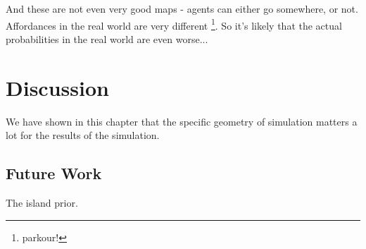 And these are not even very good maps - agents can either go somewhere, or not. Affordances in the real world are very different \footnote{parkour!}. So it's likely that the actual probabilities in the real world are even worse...


\section{Discussion}
We have shown in this chapter that the specific geometry of simulation matters a lot for the results of the simulation. 

\subsection{Future Work}
The island prior.

